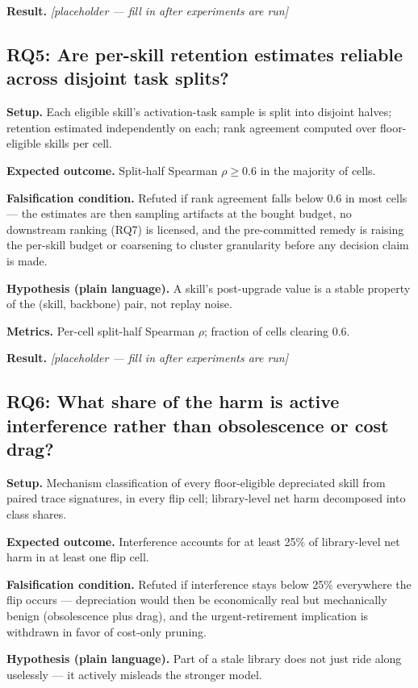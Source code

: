\documentclass[11pt]{article}
\newcommand{\resultplaceholder}{\textit{[placeholder --- fill in after experiments are run]}}
\begin{document}
\textbf{Result.} \resultplaceholder

\subsection{RQ5: Are per-skill retention estimates reliable across disjoint task splits?}

\textbf{Setup.} Each eligible skill's activation-task sample is split into disjoint halves; retention estimated independently on each; rank agreement computed over floor-eligible skills per cell.

\textbf{Expected outcome.} Split-half Spearman $\rho \geq 0.6$ in the majority of cells.

\textbf{Falsification condition.} Refuted if rank agreement falls below 0.6 in most cells --- the estimates are then sampling artifacts at the bought budget, no downstream ranking (RQ7) is licensed, and the pre-committed remedy is raising the per-skill budget or coarsening to cluster granularity before any decision claim is made.

\textbf{Hypothesis (plain language).} A skill's post-upgrade value is a stable property of the (skill, backbone) pair, not replay noise.

\textbf{Metrics.} Per-cell split-half Spearman $\rho$; fraction of cells clearing 0.6.

\textbf{Result.} \resultplaceholder

\subsection{RQ6: What share of the harm is active interference rather than obsolescence or cost drag?}

\textbf{Setup.} Mechanism classification of every floor-eligible depreciated skill from paired trace signatures, in every flip cell; library-level net harm decomposed into class shares.

\textbf{Expected outcome.} Interference accounts for at least 25\% of library-level net harm in at least one flip cell.

\textbf{Falsification condition.} Refuted if interference stays below 25\% everywhere the flip occurs --- depreciation would then be economically real but mechanically benign (obsolescence plus drag), and the urgent-retirement implication is withdrawn in favor of cost-only pruning.

\textbf{Hypothesis (plain language).} Part of a stale library does not just ride along uselessly --- it actively misleads the stronger model.
\end{document}
